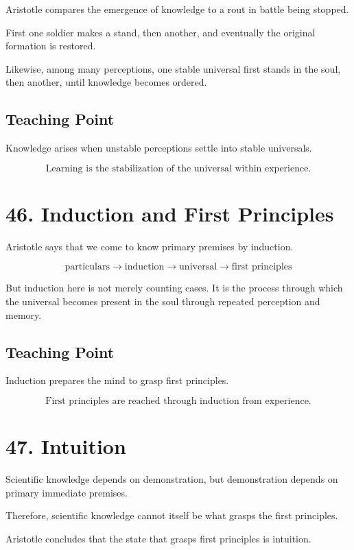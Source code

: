 \documentclass[12pt]{article}
\begin{document}
Aristotle compares the emergence of knowledge to a rout in battle being stopped.

First one soldier makes a stand, then another, and eventually the original
formation is restored.

Likewise, among many perceptions, one stable universal first stands in the soul,
then another, until knowledge becomes ordered.

\subsection*{Teaching Point}

Knowledge arises when unstable perceptions settle into stable universals.

\[
\boxed{
\text{Learning is the stabilization of the universal within experience.}
}
\]

\section*{46. Induction and First Principles}

Aristotle says that we come to know primary premises by induction.

\[
\text{particulars}
\rightarrow
\text{induction}
\rightarrow
\text{universal}
\rightarrow
\text{first principles}
\]

But induction here is not merely counting cases. It is the process through which
the universal becomes present in the soul through repeated perception and
memory.

\subsection*{Teaching Point}

Induction prepares the mind to grasp first principles.

\[
\boxed{
\text{First principles are reached through induction from experience.}
}
\]

\section*{47. Intuition}

Scientific knowledge depends on demonstration, but demonstration depends on
primary immediate premises.

Therefore, scientific knowledge cannot itself be what grasps the first
principles.

Aristotle concludes that the state that grasps first principles is intuition.
\end{document}
